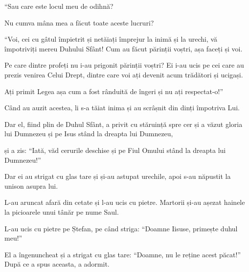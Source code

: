 {\par }{\QB “Sau care este locul meu de odihnă?


\par }{\Q {}Nu cumva mâna mea a făcut toate aceste lucruri?


\par }{\PP {}“Voi, cei cu gâtul împietrit și netăiați împrejur la inimă și la urechi, vă împotriviți mereu Duhului Sfânt! Cum au făcut părinții voștri, așa faceți și voi.

Pe care dintre profeți nu i-au prigonit părinții voștri? Ei i-au ucis pe cei care au prezis venirea Celui Drept, dintre care voi ați devenit acum trădători și ucigași.

Ați primit Legea așa cum a fost rânduită de îngeri și nu ați respectat-o!”


\par }{\PP {}Când au auzit acestea, li s-a tăiat inima și au scrâșnit din dinți împotriva Lui.

Dar el, fiind plin de Duhul Sfânt, a privit cu stăruință spre cer și a văzut gloria lui Dumnezeu și pe Isus stând la dreapta lui Dumnezeu,

și a zis: “Iată, văd cerurile deschise și pe Fiul Omului stând la dreapta lui Dumnezeu!”


\par }{\PP {}Dar ei au strigat cu glas tare și și-au astupat urechile, apoi s-au năpustit la unison asupra lui.

L-au aruncat afară din cetate și l-au ucis cu pietre. Martorii și-au așezat hainele la picioarele unui tânăr pe nume Saul.

L-au ucis cu pietre pe Ștefan, pe când striga: “Doamne Iisuse, primește duhul meu!”

El a îngenuncheat și a strigat cu glas tare: “Doamne, nu le reține acest păcat!” După ce a spus aceasta, a adormit.



\par }
